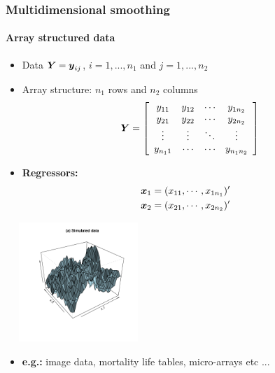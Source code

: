 \documentclass[11pt]{beamer}
\newcommand{\nologo}{\setbeamertemplate{logo}{}}
\newcommand{\bfx}{\mbox{\boldmath $x$}}
\newcommand{\bfy}{\mbox{\boldmath $y$}}
\newcommand{\bfY}{\mbox{\boldmath $Y$}}
\begin{document}


{\nologo
\begin{frame}
	\frametitle{Multidimensional smoothing}
		\framesubtitle{\quad Array structured data}
	\vspace{.08in}	
	
\footnotesize

\medskip

\begin{minipage}[c]{.45\columnwidth}

\begin{itemize}
\item \alert{Data} $\bfY= \bfy_{ij}$, {\tiny $i=1,...,n_1$ and $j=1,...,n_2$}

\item \alert{Array structure}: $n_1$ rows and $n_2$ columns
\[
\bfY = 
 \left[
\begin{array}{cccc}
 y_{11} &  y_{12} & \cdots & y_{1{}n_2} \crcr
 y_{21} &  y_{22} & \cdots & y_{2{}n_2} \crcr
 \vdots    &  \vdots    & \ddots & \vdots    \crcr
 y_{n_{1}1} &  \cdots & \cdots & y_{n_{1}n_{2}} 
\end{array}
 \right]
\]
\vspace{-0.3cm}
\item {\bf Regressors:}
\begin{align*}
 \bfx_1 &= (x_{1{}1},\cdots,x_{1{n_1}})^\prime \cr
 \bfx_2 &= (x_{2{}1},\cdots,x_{2{}n_2})^\prime
\end{align*}
\vspace{-0.3cm}
\end{itemize}
\end{minipage}
\hfill{}
\begin{minipage}[c]{.5\columnwidth}
\begin{center}
\includegraphics[width=5.5cm,height=4.5cm]{figures/EX_2dmixed_data}
\end{center}
\end{minipage}
\begin{itemize}
\item \textbf{e.g.:} image data, mortality life tables, micro-arrays etc ... 
\end{itemize}
\end{frame}
}
\end{document}
